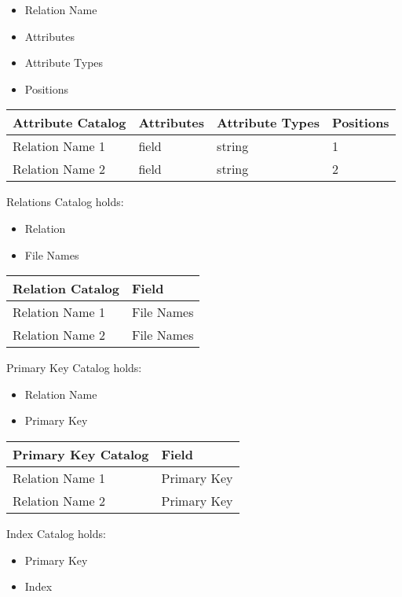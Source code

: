 \documentclass[
]{article}
\begin{document}
\begin{itemize}
\item
  Relation Name
\item
  Attributes
\item
  Attribute Types
\item
  Positions
\end{itemize}

\begin{longtable}[]{@{}llll@{}}
\toprule
Attribute Catalog & Attributes & Attribute Types & Positions \\
\midrule
\endhead
Relation Name 1 & field & string & 1 \\
Relation Name 2 & field & string & 2 \\
\bottomrule
\end{longtable}

Relations Catalog holds:

\begin{itemize}
\item
  Relation
\item
  File Names
\end{itemize}

\begin{longtable}[]{@{}ll@{}}
\toprule
Relation Catalog & Field \\
\midrule
\endhead
Relation Name 1 & File Names \\
Relation Name 2 & File Names \\
\bottomrule
\end{longtable}

Primary Key Catalog holds:

\begin{itemize}
\item
  Relation Name
\item
  Primary Key
\end{itemize}

\begin{longtable}[]{@{}ll@{}}
\toprule
Primary Key Catalog & Field \\
\midrule
\endhead
Relation Name 1 & Primary Key \\
Relation Name 2 & Primary Key \\
\bottomrule
\end{longtable}

Index Catalog holds:

\begin{itemize}
\item
  Primary Key
\item
  Index
\end{itemize}
\end{document}
